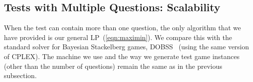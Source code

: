 \documentclass{article}
\begin{document}

\subsection{Tests with Multiple Questions: Scalability}

When the test can contain more than one question, the only algorithm that
we have provided is our general LP~(\ref{eqn:maximin}).  We compare this with the standard
solver for Bayesian Stackelberg games, DOBSS~\cite{Paruchuri08:Playing}
(using the same version of CPLEX).
The machine we use and the way we generate test
game instances (other than the number of questions) remain the same as in the previous subsection.
\end{document}
